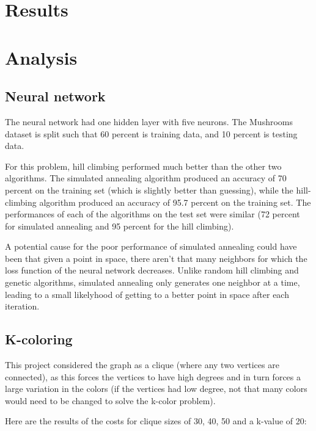 \documentclass[11pt]{article}
\begin{document}
        
        \section{Results}

        \section{Analysis}

        \subsection{Neural network}
        The neural network had one hidden layer
        with five neurons. The Mushrooms dataset is split such that 60 percent is training data, and 10 percent is testing data.

        For this problem, hill climbing performed much better than the other two algorithms.
        The simulated annealing algorithm produced an accuracy of 70 percent on the training set (which is slightly better
        than guessing), while the hill-climbing algorithm produced an accuracy of 95.7 percent on the training set. The performances
        of each of the algorithms on the test set were similar (72 percent for simulated annealing and 95 percent for the hill climbing).

        A potential cause for the poor performance of simulated annealing could have been that given a point in space,
        there aren't that many neighbors for which the loss function of the neural network decreases.
        Unlike random hill climbing and genetic algorithms, simulated annealing only generates one neighbor at
        a time, leading to a small likelyhood of getting to a better point in space after each iteration.

        \subsection{K-coloring}

        This project considered the graph as a clique (where any two vertices are connected), as this forces the vertices to have
        high degrees and in turn forces a large variation in the colors (if the vertices had low degree, not that many colors
        would need to be changed to solve the k-color problem).

        Here are the results of the costs for clique sizes of 30, 40, 50 and a k-value of 20:
\end{document}
